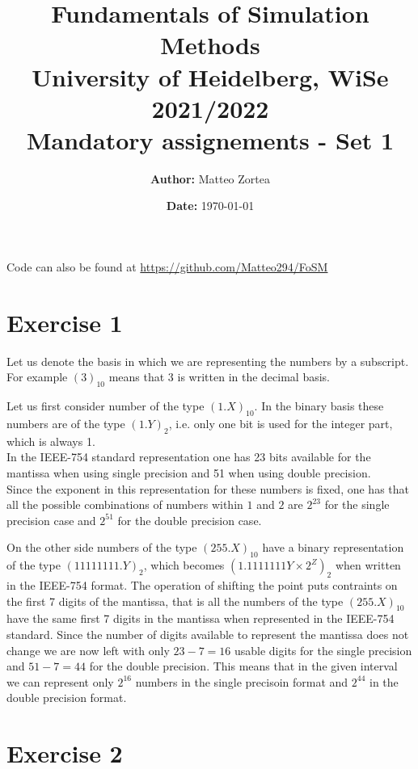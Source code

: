 \documentclass{article}
\title{\textbf{Fundamentals of Simulation Methods} \\ \vspace{5pt} \large University of Heidelberg, WiSe 2021/2022 \\ \vspace{5pt} Mandatory assignements - Set 1}
\date{\textbf{Date:} \today}
\author{\textbf{Author:} Matteo Zortea}
\begin{document}
\maketitle

\centerline{Code can also be found at \href{https://github.com/Matteo294/FoSM}{https://github.com/Matteo294/FoSM}}

\section*{Exercise 1}
    Let us denote the basis in which we are representing the numbers by a subscript. For example $(3)_{10}$ means that 3 is written in the decimal basis. \par
    \vspace{10pt}
    \raggedright Let us first consider number of the type $(1.X)_{10}$. In the binary basis these numbers are of the type $(1.Y)_2$, i.e. only one bit is used for the integer part, which is always 1. \\
    In the IEEE-754 standard representation one has 23 bits available for the mantissa when using single precision and 51 when using double precision. \\
    Since the exponent in this representation for these numbers is fixed, one has that all the possible combinations of numbers within $1$ and $2$ are $2^{23}$ for the single precision case
    and $2^{51}$ for the double precision case. \par
    \vspace{10pt}
    \raggedright On the other side numbers of the type $(255.X)_{10}$ have a binary representation of the type $(11111111.Y)_2$, which becomes 
    $(1.1111111Y \times 2^Z)_2$ when written in the IEEE-754 format. The operation of shifting the point puts contraints on the first 7 digits of the mantissa, that is all the numbers of the type $(255.X)_10$ have the same first 7 digits in the mantissa when represented in the IEEE-754 standard.
    Since the number of digits available to represent the mantissa does not change we are now left with only $23-7=16$ usable digits for the single precision and $51-7=44$ for the double precision. This means that in the given interval we can represent only $2^{16}$ numbers in the single precisoin format 
    and $2^{44}$ in the double precision format.

\section*{Exercise 2}
\end{document}
